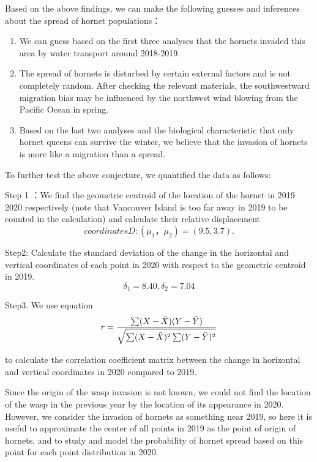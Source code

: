 \documentclass{mcmthesis}
\begin{document}
Based on the above findings, we can make the following guesses and inferences about the spread of hornet populations：

\begin{enumerate}
    \item We can guess based on the first three analyses that the hornets invaded this area by water transport around 2018-2019.
    \item The spread of hornets is disturbed by certain external factors and is not completely random. After checking the relevant materials, the southwestward migration bias may be influenced by the northwest wind blowing from the Pacific Ocean in spring.
    \item Based on the last two analyses and the biological characteristic that only hornet queens can survive the winter, we believe that the invasion of hornets is more like a migration than a spread.
\end{enumerate}

To further test the above conjecture, we quantified the data as follows:

Step 1 ：We find the geometric centroid of the location of the hornet in 2019 2020 respectively (note that Vancouver Island is too far away in 2019 to be counted in the calculation) and calculate their relative displacement \[coordinatesD:(\mu_1，\mu_2)=(9.5,3.7).\]

Step2:  Calculate the standard deviation of the change in the horizontal and vertical coordinates of each point in 2020 with respect to the geometric centroid in 2019.
\[\delta_1=8.40,\delta_2=7.04\]

Step3.   We use equation
\begin{equation}
r=\frac{\sum(X-\Bar{X})(Y-\Bar{Y})}{\sqrt{\sum(X-\Bar{X})^2\sum(Y-\Bar{Y})^2}}
\label{1}
\end{equation}

 to calculate the correlation coefficient matrix between the change in horizontal and vertical coordinates in 2020 compared to 2019.
 
 Since the origin of the wasp invasion is not known, we could not find the location of the wasp in the previous year by the location of its appearance in 2020. However, we consider the invasion of hornets as something near 2019, so here it is useful to approximate the center of all points in 2019 as the point of origin of hornets, and to study and model the probability of hornet spread based on this point for each point distribution in 2020.
    
\end{document}
